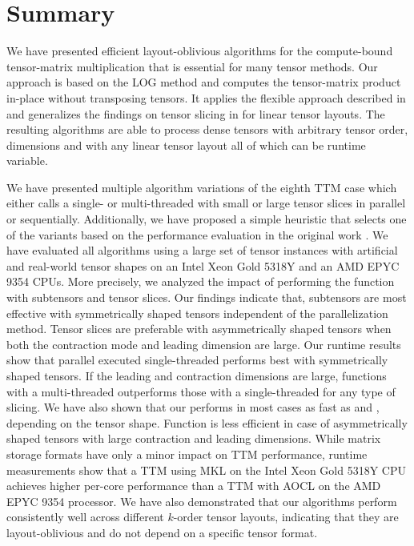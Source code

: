 \section{Summary}
\label{sec:summary}
We have presented efficient layout-oblivious algorithms for the compute-bound tensor-matrix multiplication that is essential for many tensor methods.
Our approach is based on the LOG method and computes the tensor-matrix product in-place without transposing tensors.
It applies the flexible approach described in \cite{bassoy:2019:ttv} and generalizes the findings on tensor slicing in \cite{li:2015:input} for linear tensor layouts.
The resulting algorithms are able to process dense tensors with arbitrary tensor order, dimensions and with any linear tensor layout all of which can be runtime variable.

We have presented multiple algorithm variations of the eighth TTM case which either calls a single- or multi-threaded  with small or large tensor slices in parallel or sequentially.
Additionally, we have proposed a simple heuristic that selects one of the variants based on the performance evaluation in the original work \cite{bassoy:2024:ttm}.
We have evaluated all algorithms using a large set of tensor instances with artificial and real-world tensor shapes on an Intel Xeon Gold 5318Y and an AMD EPYC 9354 CPUs.
More precisely, we analyzed the impact of performing the  function with subtensors and tensor slices.
Our findings indicate that, subtensors are most effective with symmetrically shaped tensors independent of the parallelization method. 
Tensor slices are preferable with asymmetrically shaped tensors when both the contraction mode and leading dimension are large.
Our runtime results show that parallel executed single-threaded  performs best with symmetrically shaped tensors.
If the leading and contraction dimensions are large, functions with a multi-threaded  outperforms those with a single-threaded  for any type of slicing.
We have also shown that our  performs in most cases as fast as  and , depending on the tensor shape.
Function  is less efficient in case of asymmetrically shaped tensors with large contraction and leading dimensions.
While matrix storage formats have only a minor impact on TTM performance, runtime measurements show that a TTM using MKL on the Intel Xeon Gold 5318Y CPU achieves higher per-core performance than a TTM with AOCL on the AMD EPYC 9354 processor.
We have also demonstrated that our algorithms perform consistently well across different $k$-order tensor layouts, indicating that they are layout-oblivious and do not depend on a specific tensor format.


